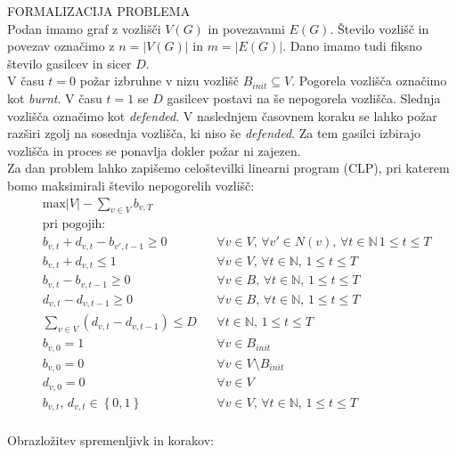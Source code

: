 \documentclass[a4paper, 11pt]{article}
\begin{document}
\noindent FORMALIZACIJA PROBLEMA \\
Podan imamo graf z vozlišči $V\left(G\right)$ in povezavami $E\left(G\right)$.
Število vozlišč in povezav označimo z $n = \left|V\left(G\right)\right|$ in $m = \left|E\left(G\right)\right|$.
Dano imamo tudi fiksno število gasilcev in sicer $D$. \\
V času $t = 0$ požar izbruhne v nizu vozlišč $B_{init} \subseteq V$. Pogorela vozlišča
označimo kot \emph{burnt}.
V času $t = 1$ se $D$ gasilcev postavi na še nepogorela vozlišča. Slednja vozlišča 
označimo kot \emph{defended}.
V naslednjem časovnem koraku se lahko požar razširi zgolj na sosednja vozlišča, ki niso še \emph{defended}.
Za tem gasilci izbirajo vozlišča in proces se ponavlja dokler požar ni zajezen. \\
Za dan problem lahko zapišemo celoštevilki linearni program (CLP), pri katerem
bomo maksimirali število nepogorelih vozlišč:
\begin{align*}
    & \text{max} \left|V\right| - \sum_{v \in V}{b_{v, T}} \\
    & \text{pri pogojih:} \\
    & b_{v,t} + d_{v,t} - b_{v',t-1} \ge 0 && \forall v \in V ,\, \forall v' \in N(v) ,\, \forall t \in \mathbb{N} \, 1 \le t \le T \\
    & b_{v,t} + d_{v,t} \le 1 && \forall v \in V ,\, \forall t \in \mathbb{N} ,\, 1 \le t \le T \\
    & b_{v,t} - b_{v,t-1} \ge 0 && \forall v \in B ,\, \forall t \in \mathbb{N} ,\, 1 \le t \le T \\
    & d_{v,t} - d_{v,t-1} \ge 0 && \forall v \in B ,\, \forall t \in \mathbb{N} ,\, 1 \le t \le T \\
    & \sum_{v \in V}{\left( d_{v,t} - d_{v, t-1} \right)} \le D && \forall t \in \mathbb{N} ,\, 1 \le t \le T \\
    & b_{v,0} = 1 && \forall v \in B_{init} \\
    & b_{v,0} = 0 && \forall v \in V \setminus B_{init} \\
    & d_{v,0} = 0 && \forall v \in V \\
    & b_{v,t} ,\, d_{v,t} \in \left\{ 0, 1 \right\} && \forall v \in V ,\, \forall t \in \mathbb{N} ,\, 1 \le t \le T \\
\end{align*}

Obrazložitev spremenljivk in korakov:
\end{document}
